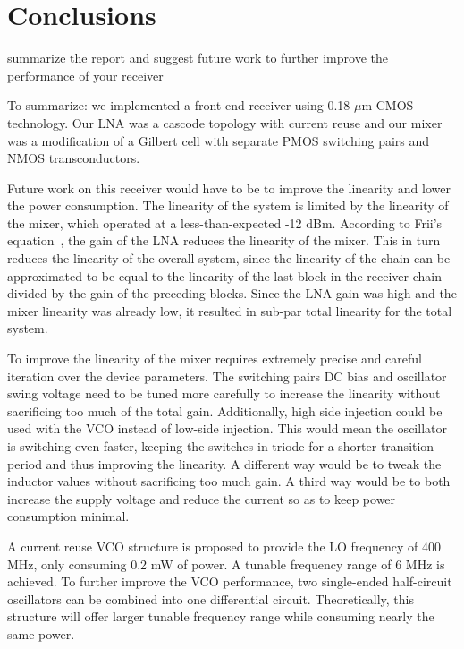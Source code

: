 \section{Conclusions}
summarize the report and suggest future work to further improve the performance of your receiver

To summarize: we implemented a front end receiver using 0.18 $\mu$m CMOS technology. Our LNA was a cascode topology with current reuse and our mixer was a modification of a Gilbert cell with separate PMOS switching pairs and NMOS transconductors. 

Future work on this receiver would have to be to improve the linearity and lower the power consumption. The linearity of the system is limited by the linearity of the mixer, which operated at a less-than-expected -12 dBm. According to Frii's equation~\cite{Razavi}, the gain of the LNA reduces the linearity of the mixer. This in turn reduces the linearity of the overall system, since the linearity of the chain can be approximated to be equal to the linearity of the last block in the receiver chain divided by the gain of the preceding blocks. Since the LNA gain was high and the mixer linearity was already low, it resulted in sub-par total linearity for the total system. 

To improve the linearity of the mixer requires extremely precise and careful iteration over the device parameters. The switching pairs DC bias and oscillator swing voltage need to be tuned more carefully to increase the linearity without sacrificing too much of the total gain. Additionally, high side injection could be used with the VCO instead of low-side injection. This would mean the oscillator is switching even faster, keeping the switches in triode for a shorter transition period and thus improving the linearity. A different way would be to tweak the inductor values without sacrificing too much gain. A third way would be to both increase the supply voltage and reduce the current so as to keep power consumption minimal.

A current reuse VCO structure is proposed to provide the LO frequency of 400 MHz, only consuming 0.2 mW of power. A tunable frequency range of 6 MHz is achieved.  To further improve the VCO performance, two single-ended half-circuit oscillators can be combined into one differential circuit. Theoretically, this structure will offer larger tunable frequency range while consuming nearly the same power.